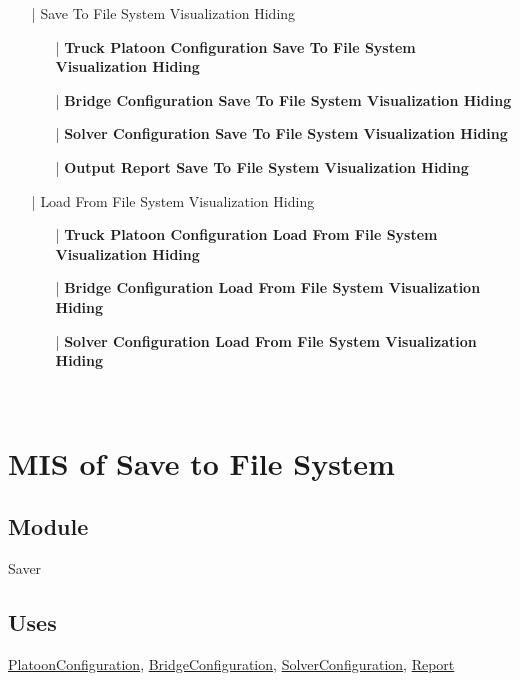 \documentclass[12pt, titlepage]{article}
\begin{document}
\begin{enumerate}
\begin{enumerate}
\begin{enumerate}
            \begin{itemize}
                \item[|] {Save To File System Visualization Hiding}
                \begin{itemize}
                    \item[|] \textbf{Truck Platoon Configuration Save To File System Visualization Hiding}
                    \item[|] \textbf{Bridge Configuration Save To File System Visualization Hiding}
                    \item[|] \textbf{Solver Configuration Save To File System Visualization Hiding}
                    \item[|] \textbf{Output Report Save To File System Visualization Hiding}
                \end{itemize}
                \item[|] {Load From File System Visualization Hiding}
                \begin{itemize}
                    \item[|] \textbf{Truck Platoon Configuration Load From File System Visualization Hiding}
                    \item[|] \textbf{Bridge Configuration Load From File System Visualization Hiding}
                    \item[|] \textbf{Solver Configuration Load From File System Visualization Hiding}
                \end{itemize}
            \end{itemize}
        \end{enumerate}
    \end{enumerate}
\end{enumerate}

~\newpage

\section{MIS of Save to File System}\label{Saver}

\subsection{Module}

Saver

\subsection{Uses}
\hyperref[PlatoonConfiguration]{PlatoonConfiguration}, \hyperref[BridgeConfiguration]{BridgeConfiguration}, \hyperref[SolverConfiguration]{SolverConfiguration}, \hyperref[Report]{Report}
\end{document}
